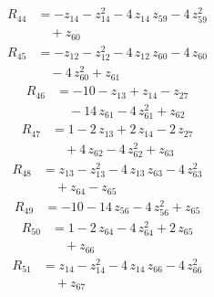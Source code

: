 \begin{equation*}\begin{aligned}
R_{44}&=-z_{14} -z_{14}^{2} -4\,z_{14}\,z_{59} -4\,z_{59}^{2} \\
&\quad +z_{60}
\end{aligned}\end{equation*}
\begin{equation*}\begin{aligned}
R_{45}&=-z_{12} -z_{12}^{2} -4\,z_{12}\,z_{60} -4\,z_{60} \\
&\quad -4\,z_{60}^{2} +z_{61}
\end{aligned}\end{equation*}
\begin{equation*}\begin{aligned}
R_{46}&=-10 -z_{13} +z_{14} -z_{27} \\
&\quad -14\,z_{61} -4\,z_{61}^{2} +z_{62}
\end{aligned}\end{equation*}
\begin{equation*}\begin{aligned}
R_{47}&=1 -2\,z_{13} +2\,z_{14} -2\,z_{27} \\
&\quad +4\,z_{62} -4\,z_{62}^{2} +z_{63}
\end{aligned}\end{equation*}
\begin{equation*}\begin{aligned}
R_{48}&=z_{13} -z_{13}^{2} -4\,z_{13}\,z_{63} -4\,z_{63}^{2} \\
&\quad +z_{64} -z_{65}
\end{aligned}\end{equation*}
\begin{equation*}\begin{aligned}
R_{49}&=-10 -14\,z_{56} -4\,z_{56}^{2} +z_{65}
\end{aligned}\end{equation*}
\begin{equation*}\begin{aligned}
R_{50}&=1 -2\,z_{64} -4\,z_{64}^{2} +2\,z_{65} \\
&\quad +z_{66}
\end{aligned}\end{equation*}
\begin{equation*}\begin{aligned}
R_{51}&=z_{14} -z_{14}^{2} -4\,z_{14}\,z_{66} -4\,z_{66}^{2} \\
&\quad +z_{67}
\end{aligned}\end{equation*}

